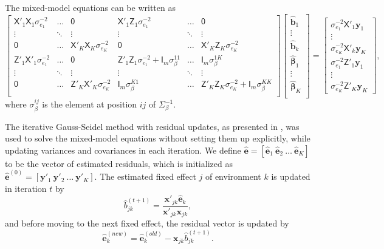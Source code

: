 \documentclass{bmcart}
\newcommand{\vecx}{\boldsymbol}
\newcommand{\mat}[1]{\boldsymbol{\mathsf{#1}}}
\begin{document}
The mixed-model equations can be written as
\begin{equation}\nonumber
\label{eqn:MME}
\begin{bmatrix}
\mat{X}'_1\mat{X}_1\sigma^{-2}_{e_1} & \hdots & \mat{0} & \mat{X}'_1\mat{Z}_1\sigma^{-2}_{e_1} & \hdots & \mat{0}\\
\vdots & \ddots & \vdots & \vdots & \ddots & \vdots\\
\mat{0} & \hdots & \mat{X}'_K\mat{X}_K\sigma^{-2}_{e_K} & \mat{0} & \hdots & \mat{X}'_K\mat{Z}_K\sigma^{-2}_{e_K}\\
\mat{Z}'_1\mat{X}'_1\sigma^{-2}_{e_1} & \hdots & \mat{0} & \mat{Z}'_1\mat{Z}_1\sigma^{-2}_{e_1}+\mat{I}_m\sigma^{11}_{\beta} & \hdots & \mat{I}_m\sigma^{1K}_{\beta}\\
\vdots & \ddots & \vdots & \vdots & \ddots & \vdots\\
\mat{0} & \hdots & \mat{Z}'_K\mat{X}'_K\sigma^{-2}_{e_K} & \mat{I}_m\sigma^{K1}_{\beta} & \hdots & \mat{Z}'_K\mat{Z}_K\sigma^{-2}_{e_K}+\mat{I}_m\sigma^{KK}_{\beta}\\
\end{bmatrix}
\begin{bmatrix}
\hat{\vecx{b}}_1\\
\vdots\\
\hat{\vecx{b}}_k\\
\hat{\vecx{\beta}}_1\\
\vdots\\
\hat{\vecx{\beta}}_K\\
\end{bmatrix}
=
\begin{bmatrix}
\sigma^{-2}_{e_1}\mat{X}'_1\vecx{y}_1\\
\vdots\\
\sigma^{-2}_{e_K}\mat{X}'_k\vecx{y}_K\\
\sigma^{-2}_{e_1}\mat{Z}'_1\vecx{y}_1\\
\vdots\\
\sigma^{-2}_{e_K}\mat{Z}'_K\vecx{y}_K
\end{bmatrix},
\end{equation}
where $\sigma^{ij}_{\beta}$ is the element at position $ij$ of $\mat{\Sigma}^{-1}_{\beta}$.

The iterative Gauss-Seidel method with residual updates, as presented in \cite{GSRU}, was used to solve the mixed-model equations without setting them up explicitly, while updating variances and covariances in each iteration. We define $\hat{\vecx{e}} = [\hat{\vecx{e}}_1~\hat{\vecx{e}}_2~\hdots~\hat{\vecx{e}}_K]$ to be the vector of estimated residuals, which is initialized as $\hat{\vecx{e}}^{(0)} = [\vecx{y}'_1~\vecx{y}'_2~\hdots~\vecx{y}'_K]$. The estimated fixed effect $j$ of environment $k$ is updated in iteration $t$ by
\begin{equation}\nonumber
\label{eqn:MU1}
\hat{b}^{(t+1)}_{jk} = \frac{\vecx{x}'_{jk}\hat{\vecx{e}}_k}{
\vecx{x}'_{jk}\vecx{x}_{jk}},
\end{equation}
and before moving to the next fixed effect, the residual vector is updated by
\begin{equation}\nonumber
\label{eqn:MU2}
\hat{\vecx{e}}^{(new)}_k = \hat{\vecx{e}}^{(old)}_k - \vecx{x}_{jk}\hat{b}^{(t+1)}_{jk}.
\end{equation}
\end{document}
